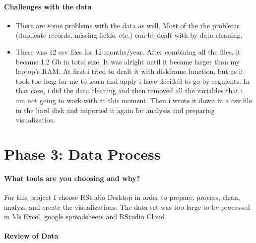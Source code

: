 \documentclass[
]{article}
\begin{document}
\hypertarget{challenges-with-the-data}{%
\paragraph{\texorpdfstring{\textbf{Challenges with the
data}}{Challenges with the data}}\label{challenges-with-the-data}}

\begin{itemize}
\item
  There are some problems with the data as well. Most of the the
  problems (duplicate records, missing fields, etc.) can be dealt with
  by data cleaning.
\item
  There was 12 csv files for 12 months/year. After combining all the
  files, it became 1.2 Gb in total size. It was alright until it became
  larger than my laptop's RAM. At first i tried to dealt it with
  diskframe function, but as it took too long for me to learn and apply
  i have decided to go by segments. In that case, i did the data
  cleaning and then removed all the variables that i am not going to
  work with at this moment. Then i wrote it down in a csv file in the
  hard disk and imported it again for analysis and preparing
  visualization.
\end{itemize}

\hypertarget{phase-3-data-process}{%
\section{\texorpdfstring{\textbf{Phase 3: Data
Process}}{Phase 3: Data Process}}\label{phase-3-data-process}}

\hypertarget{what-tools-are-you-choosing-and-why}{%
\paragraph{\texorpdfstring{\textbf{What tools are you choosing and
why?}}{What tools are you choosing and why?}}\label{what-tools-are-you-choosing-and-why}}

For this project I choose RStudio Desktop in order to prepare, process,
clean, analyze and create the visualizations. The data set was too large
to be processed in Ms Excel, google spreadsheets and RStudio Cloud.

\hypertarget{review-of-data}{%
\paragraph{\texorpdfstring{\textbf{Review of
Data}}{Review of Data}}\label{review-of-data}}
\end{document}
